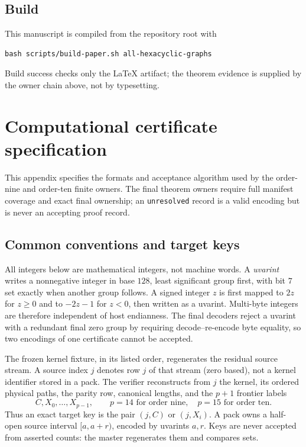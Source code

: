 \documentclass[11pt]{article}
\theoremstyle{definition}
\theoremstyle{remark}
\begin{document}
\subsection{Build}

This manuscript is compiled from the repository root with
\begin{verbatim}
bash scripts/build-paper.sh all-hexacyclic-graphs
\end{verbatim}
Build success checks only the LaTeX artifact; the theorem evidence is supplied
by the owner chain above, not by typesetting.

\section{Computational certificate specification}
\label{app:certificate}

This appendix specifies the formats and acceptance algorithm used by the
order-nine and order-ten finite owners.  The final theorem owners require full
manifest coverage and exact final ownership; an \texttt{unresolved} record is
a valid encoding but is never an accepting proof record.

\subsection{Common conventions and target keys}

All integers below are mathematical integers, not machine words.  A
\emph{uvarint} writes a nonnegative integer in base $128$, least significant
group first, with bit $7$ set exactly when another group follows.  A signed
integer $z$ is first mapped to $2z$ for $z\ge0$ and to $-2z-1$ for $z<0$, then
written as a uvarint.  Multi-byte integers are therefore independent of host
endianness.  The final decoders reject a uvarint with a redundant final zero
group by requiring decode--re-encode byte equality, so two encodings of one
certificate cannot be accepted.

The frozen kernel fixture, in its listed order, regenerates the residual source
stream.  A source index $j$ denotes row $j$ of that stream (zero based), not a
kernel identifier stored in a pack.  The verifier reconstructs from $j$ the
kernel, its ordered physical paths, the parity row, canonical lengths, and the
$p+1$ frontier labels
\[
  C, X_0,\ldots,X_{p-1},
  \qquad p=14\text{ for order nine},\quad p=15\text{ for order ten}.
\]
Thus an exact target key is the pair $(j,C)$ or $(j,X_i)$.  A pack owns a
half-open source interval $[a,a+r)$, encoded by uvarints $a,r$.  Keys are never
accepted from asserted counts: the master regenerates them and compares sets.
\end{document}
